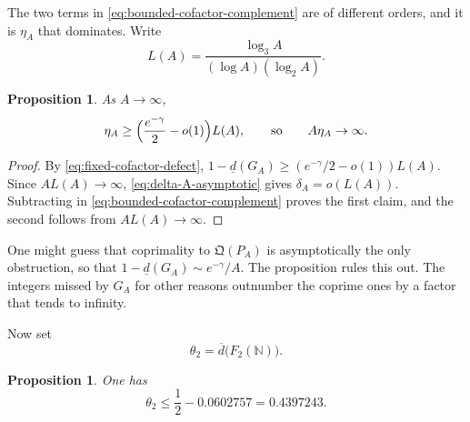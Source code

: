 \documentclass[11pt]{article}
\newtheorem{proposition}[theorem]{Proposition}
\theoremstyle{remark}
\newcommand{\N}{\mathbb N}
\newcommand{\1}{\mathbf 1}
\newcommand{\lowerdens}{\underline d}
\newcommand{\upperdens}{\overline d}
\begin{document}
The two terms in \eqref{eq:bounded-cofactor-complement} are of different
orders, and it is $\eta_A$ that dominates.  Write
\[
 L(A)=\frac{\log_3A}{(\log A)(\log_2A)} .
\]

\begin{proposition}\label{prop:fm-eta}
As $A\to\infty$,
\[
 \eta_A\geq\Bigl(\frac{e^{-\gamma}}2-o(1)\Bigr)L(A),
 \qquad\text{so}\qquad A\eta_A\to\infty .
\]
\end{proposition}

\begin{proof}
By \eqref{eq:fixed-cofactor-defect},
$1-\lowerdens(G_A)\geq(e^{-\gamma}/2-o(1))L(A)$.  Since $AL(A)\to\infty$,
\eqref{eq:delta-A-asymptotic} gives $\delta_A=o(L(A))$.  Subtracting in
\eqref{eq:bounded-cofactor-complement} proves the first claim, and the
second follows from $AL(A)\to\infty$.
\end{proof}

One might guess that coprimality to $\mathfrak Q(P_A)$ is asymptotically
the only obstruction, so that $1-\lowerdens(G_A)\sim e^{-\gamma}/A$.  The
proposition rules this out.  The integers missed by $G_A$ for other reasons
outnumber the coprime ones by a factor that tends to infinity.

Now set 
\[
 \theta_2=\upperdens\bigl(F_2(\N)\bigr).
\]

\begin{proposition}\label{prop:theta-two}
One has
\[
 \theta_2\leq\frac12-0.0602757=0.4397243.
\]
\end{proposition}
\end{document}
